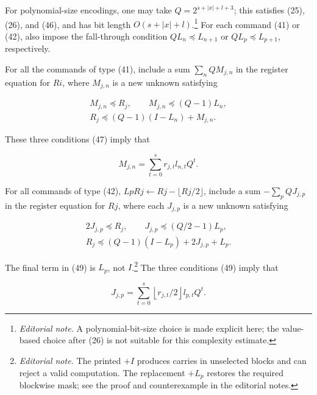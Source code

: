\documentclass[11pt,leqno]{article}
\newcommand{\origpage}[1]{\marginnote{\footnotesize\textbf{[#1]}}}
\newcommand{\ednote}[1]{\footnote{\textit{Editorial note.} #1}}
\begin{document}
For polynomial-size encodings, one may take $Q=2^{s+|x|+l+3}$; this satisfies (25), (26), and (46), and has bit length $O(s+|x|+l)$.\ednote{A polynomial-bit-size choice is made explicit here; the value-based choice after (26) is not suitable for this complexity estimate.} For each command (41) or (42), also impose the fall-through condition $Q L_n\preccurlyeq L_{n+1}$ or $Q L_p\preccurlyeq L_{p+1}$, respectively.

\origpage{827}For all the commands of type (41), include a sum $\sum_{n} Q M_{j, n}$ in the register equation for $R i$, where $M_{j, n}$ is a new unknown satisfying

\begin{equation*}
\begin{gathered}
M_{j,n}\preccurlyeq R_j,\qquad M_{j,n}\preccurlyeq(Q-1)L_n,\\
R_j\preccurlyeq(Q-1)(I-L_n)+M_{j,n}.
\end{gathered} \tag{47}\label{eq:47}
\end{equation*}

These three conditions (47) imply that

\begin{equation*}
M_{j, n}=\sum_{t=0}^{s} r_{j, t} l_{n, t} Q^{t} . \tag{48}\label{eq:48}
\end{equation*}

For all commands of type (42), $L p R j \leftarrow R j-\lfloor R j / 2\rfloor$, include a sum $-\sum_{p} Q J_{j, p}$ in the register equation for $R j$, where each $J_{j, p}$ is a new unknown satisfying

\begin{equation*}
\begin{gathered}
2J_{j,p}\preccurlyeq R_j,\qquad J_{j,p}\preccurlyeq(Q/2-1)L_p,\\
R_j\preccurlyeq(Q-1)(I-L_p)+2J_{j,p}+L_p.
\end{gathered} \tag{49}\label{eq:49}
\end{equation*}

The final term in (49) is $L_p$, not $I$.\ednote{The printed $+I$ produces carries in unselected blocks and can reject a valid computation. The replacement $+L_p$ restores the required blockwise mask; see the proof and counterexample in the editorial notes.} The three conditions (49) imply that

\begin{equation*}
J_{j, p}=\sum_{t=0}^{s}\left\lfloor r_{j, t} / 2\right\rfloor l_{p, t} Q^{t} . \tag{50}\label{eq:50}
\end{equation*}
\end{document}
